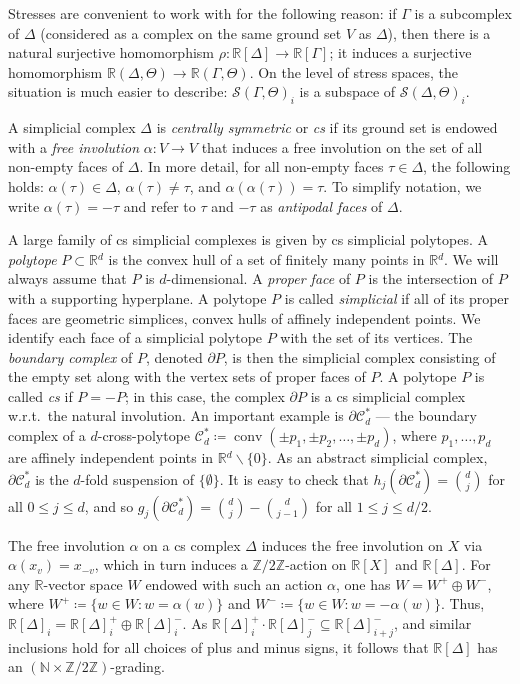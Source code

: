 \documentclass[ALCO,ThmDefs,Unicode,epreuves]{cedram}
\DeclareMathOperator{\conv}{conv}
\newcommand{\N}{\mathbb{N}}
\newcommand{\R}{\mathbb{R}{}}
\newcommand{\Z}{{\mathbb Z}}
\def\C{\mathcal{C}}
\newcommand{\Stress}{\mathcal{S}}
\begin{document}
Stresses are convenient to work with for the following reason: if $\Gamma$ is a subcomplex of $\Delta$ (considered as a complex on the same ground set $V$ as $\Delta$), then there is a natural surjective homomorphism $\rho:\R[\Delta] \to \R[\Gamma]$; it induces a surjective homomorphism $\R(\Delta,\Theta) \to \R(\Gamma,\Theta)$. On the level of stress spaces, the situation is much easier to describe: $\Stress(\Gamma,\Theta)_i$ is a subspace of $\Stress(\Delta,\Theta)_i$.

A simplicial complex $\Delta$ is \emph{centrally symmetric} or \emph{cs} if its ground set is endowed with a \emph{free involution} $\alpha: V \rightarrow V$ that induces a free involution on the set of all non-empty faces of $\Delta$. In more detail, for all non-empty faces $\tau \in \Delta$, the following holds: $\alpha(\tau)\in\Delta$, $\alpha(\tau)\neq \tau$, and $\alpha(\alpha(\tau))=\tau$. To simplify notation, we write $\alpha(\tau)=-\tau$ and refer to $\tau$ and $-\tau$ as \emph{antipodal faces} of $\Delta$. 

A large family of cs simplicial complexes is given by cs simplicial polytopes. A \emph{polytope} $P\subset \R^d$ is the convex hull of a set of finitely many points in $\R^d$. We will always assume that $P$ is $d$-dimensional. A \emph{proper face} of $P$ is the intersection of $P$ with a supporting hyperplane. A polytope $P$ is called \emph{simplicial} if all of its proper faces are geometric simplices, \ie convex hulls of affinely independent points. We identify each face of a simplicial polytope $P$ with the set of its vertices. The \emph{boundary complex} of $P$, denoted $\partial P$, is then the simplicial complex consisting of the empty set along with the vertex sets of proper faces of $P$. A polytope $P$ is called \emph{cs} if $P=-P$; in this case, the complex $\partial P$ is a cs simplicial complex w.r.t.~the natural involution. An important example is $\partial\C^*_d$ --- the boundary complex of a $d$-cross-polytope $\C^*_d\coloneqq \conv(\pm p_1,\pm p_2,\ldots, \pm p_d)$, where $p_1,\ldots,p_d$ are affinely independent points in $\R^d\backslash\{0\}$. As an abstract simplicial complex, $\partial\C^*_d$ is the $d$-fold suspension of $\{\emptyset\}$. It is easy to check that $h_j(\partial \C_d^*)=\binom{d}{j}$ for all $0\leq j\leq d$, and so $g_j(\partial \C_d^*)=\binom{d}{j}-\binom{d}{j-1}$ for all $1\leq j\leq d/2$.


The free involution $\alpha$ on a cs complex $\Delta$ induces the free involution on $X$ via $\alpha(x_v)=x_{-v}$, which in turn induces a $\Z/2\Z$-action on $\R[X]$ and $\R[\Delta]$. For any $\R$-vector space $W$ endowed with such an action $\alpha$, one has $W=W^+\oplus W^-$, where $W^+\coloneqq \{w\in W: w=\alpha(w)\}$ and $W^-\coloneqq \{w\in W: w=-\alpha(w)\}$. Thus,
$\R[\Delta]_i=\R[\Delta]^+_i\oplus \R[\Delta]^-_i$. As $\R[\Delta]^+_{i}\cdot\R[\Delta]^-_j \subseteq \R[\Delta]^{-}_{i+j}$, and similar inclusions hold for all choices of plus and minus signs, it follows that $\R[\Delta]$ has an $(\N\times \Z/2\Z)$-grading. 
\end{document}
